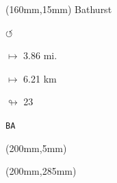 \begin{textblock*}{40mm}(160mm,15mm)%
Bathurst
\par \Huge$\circlearrowleft$
\Large
\par$\mapsto$ 3.86 mi.
\par$\mapsto$ 6.21 km
\par$\looparrowright$ 23
\par\hfill\tiny\tt BA\\
\end{textblock*}
\begin{textblock*}{20mm}(200mm,5mm)%
\fbox{\thepage}
\end{textblock*}
\begin{textblock*}{20mm}(200mm,285mm)%
\fbox{\thepage}
\end{textblock*}
\null\newpage

